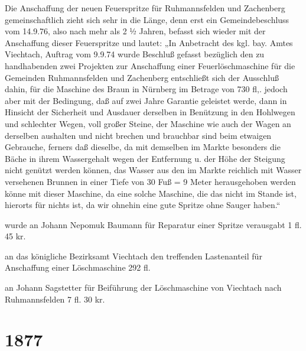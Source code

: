 \documentclass[12pt,a4paper]{book}
\begin{document}
Die Anschaffung der neuen Feuerspritze für Ruhmannsfelden und Zachenberg
gemeinschaftlich zieht sich sehr in die Länge, denn erst ein Gemeindebeschluss
vom 14.9.76, also nach mehr als 2 ½ Jahren, befasst sich wieder mit der
Anschaffung dieser Feuerspritze und lautet: „In Anbetracht des kgl. bay. Amtes
Viechtach, Auftrag vom 9.9.74 wurde Beschluß gefasst bezüglich den zu
handhabenden zwei Projekten zur Anschaffung einer Feuerlöschmaschine für die
Gemeinden Ruhmannsfelden und Zachenberg entschließt sich der Ausschluß dahin,
für die Maschine des Braun in Nürnberg im Betrage von 730 fl,. jedoch aber mit
der Bedingung, daß auf zwei Jahre Garantie geleistet werde, dann in Hinsicht der
Sicherheit und Ausdauer derselben in Benützung in den Hohlwegen und schlechter
Wegen, voll großer Steine, der Maschine wie auch der Wagen an derselben
aushalten und nicht brechen und brauchbar sind beim etwaigen Gebrauche, ferners
daß dieselbe, da mit demselben im Markte besonders die Bäche in ihrem
Wassergehalt wegen der Entfernung u. der Höhe der Steigung nicht genützt werden
können, das Wasser aus den im Markte reichlich mit Wasser versehenen Brunnen in
einer Tiefe von 30 Fuß = 9 Meter herausgehoben werden könne mit dieser Maschine,
da eine solche Maschine, die das nicht im Stande ist, hierorts für nichts ist,
da wir ohnehin eine gute Spritze ohne Sauger haben.“

wurde an Johann Nepomuk Baumann für Reparatur einer Spritze verausgabt 1 fl. 45
kr.

an das königliche Bezirksamt Viechtach den treffenden Lastenanteil für
Anschaffung einer Löschmaschine 292 fl.

an Johann Sagstetter für Beiführung der Löschmaschine von Viechtach nach
Ruhmannsfelden 7 fl. 30 kr.

\section*{1877}
\end{document}
